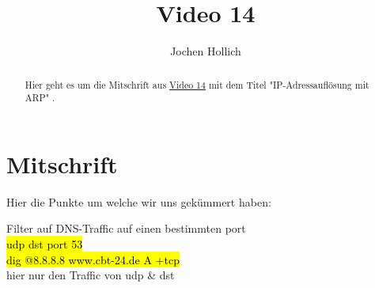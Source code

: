 \documentclass[]{article}
\title{Video 14}
\author{Jochen Hollich}
\begin{document}
	
	\maketitle %
	
	\begin{abstract}
		Hier geht es um die Mitschrift aus \href{https://www.udemy.com/course/hacking-und-netzwerkanalyse-mit-wireshark-der-komplettkurs/learn/lecture/6851616#announcements}{Video 14} mit dem Titel "IP-Adressauflösung mit ARP" .
	\end{abstract}
	
	\newpage
	
	\section{Mitschrift}
	Hier die Punkte um welche wir uns gekümmert haben:
	\begin{description}
		\item Filter auf DNS-Traffic auf einen bestimmten port  \\ 
		{\hl{udp dst port 53}} \\
		{\hl{dig @8.8.8.8 www.cbt-24.de A +tcp}} \\ 
		hier nur den Traffic von udp \& dst 
	\end{description}
	
\end{document}
